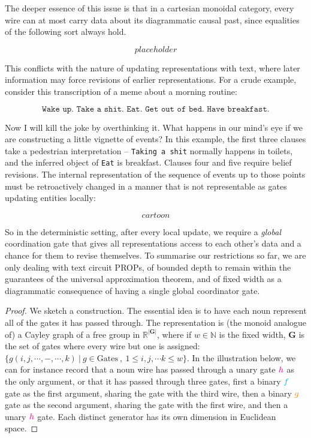 \begin{fullwidth}
\begin{example}
\end{example}

The deeper essence of this issue is that in a cartesian monoidal category, every wire can at most carry data about its diagrammatic causal past, since equalities of the following sort always hold.

\[placeholder\]

This conflicts with the nature of updating representations with text, where later information may force revisions of earlier representations. For a crude example, consider this transcription of a meme about a morning routine:

\[\texttt{Wake up. Take a shit. Eat. Get out of bed. Have breakfast.}\]

Now I will kill the joke by overthinking it. What happens in our mind's eye if we are constructing a little vignette of events? In this example, the first three clauses take a pedestrian interpretation -- \texttt{Taking a shit} normally happens in toilets, and the inferred object of \texttt{Eat} is breakfast. Clauses four and five require belief revisions. The internal representation of the sequence of events up to those points must be retroactively changed in a manner that is not representable as gates updating entities locally:

\[cartoon\]

So in the deterministic setting, after every local update, we require a \emph{global} coordination gate that gives all representations access to each other's data and a chance for them to revise themselves. To summarise our restrictions so far, we are only dealing with text circuit PROPs, of bounded depth to remain within the guarantees of the universal approximation theorem, and of fixed width as a diagrammatic consequence of having a single global coordinator gate.

\begin{theorem}
\begin{proof}

We sketch a construction. The essential idea is to have each noun represent all of the gates it has passed through. The representation is (the monoid analogue of) a Cayley graph of a free group in $\mathbb{R}^{|\mathbf{G}|}$, where if $w \in \mathbb{N}$ is the fixed width, $\mathbf{G}$ is the set of gates where every wire but one is assigned: $\{ g(i,j,\cdots,-,\cdots,k) \ | \ g \in \text{Gates} \ , \ 1 \leq i,j,\cdots k \leq w\}$. In the illustration below, we can for instance record that a noun wire has passed through a unary gate $\textcolor{magenta}{h}$ as the only argument, or that it has passed through three gates, first a binary $\textcolor{cyan}{f}$ gate as the first argument, sharing the gate with the third wire, then a binary $\textcolor{orange}{g}$ gate as the second argument, sharing the gate with the first wire, and then a unary $\textcolor{magenta}{h}$ gate. Each distinct generator has its own dimension in Euclidean space.


\end{proof}
\end{theorem}
\end{fullwidth}
